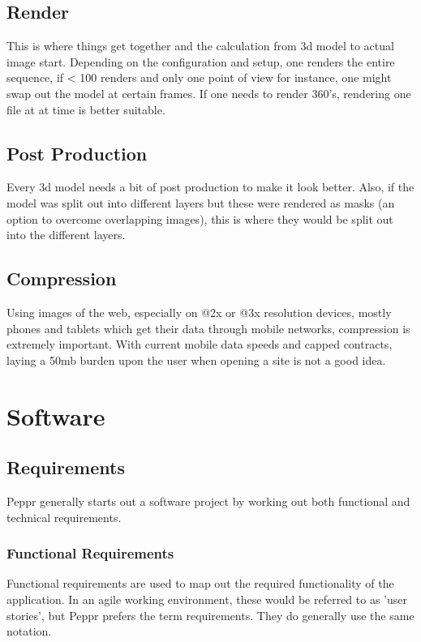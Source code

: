 \subsection{Render}
This is where things get together and the calculation from 3d model to actual image start. Depending on the configuration and setup, one renders the entire sequence, if < 100 renders and only one point of view for instance, one might swap out the model at certain frames. If one needs to render 360's, rendering one file at at time is better suitable.
\subsection{Post Production}
Every 3d model needs a bit of post production to make it look better. Also, if the model was split out into different layers but these were rendered as masks (an option to overcome overlapping images), this is where they would be split out into the different layers.
\subsection{Compression}
Using images of the web, especially on @2x or @3x resolution devices, mostly phones and tablets which get their data through mobile networks, compression is extremely important. With current mobile data speeds and capped contracts, laying a 50mb burden upon the user when opening a site is not a good idea.

\section{Software}
\subsection{Requirements}
Peppr generally starts out a software project by working out both functional and technical requirements.

\subsubsection{Functional Requirements}
Functional requirements are used to map out the required functionality of the application. In an agile \cite{Agile: User Stories} working environment, these would be referred to as 'user stories', but Peppr prefers the term requirements. They do generally use the same notation.\newline

